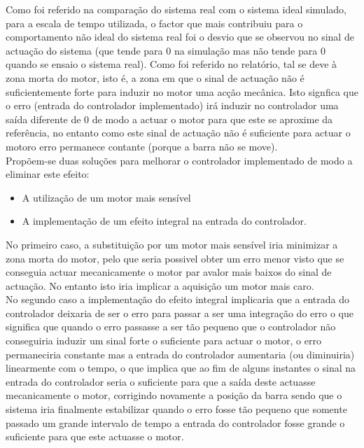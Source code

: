 \documentclass[%
  reprint,
  nofootinbib,
  amsmath,amssymb,
  aps,
  10pt,
  a4paper
]{revtex4-1}
\begin{document}
Como foi referido na comparação do sistema real com o sistema ideal simulado, para a escala de tempo utilizada, o factor que mais contribuiu para o comportamento não ideal do sistema real foi o desvio que se observou no sinal de actuação do sistema (que tende para 0 na simulação mas não tende para 0 quando se ensaio o sistema real). Como foi referido no relatório, tal se deve à zona morta do motor, isto é, a zona em que o sinal de actuação não é suficientemente forte para induzir no motor uma acção mecânica. Isto signfica que o erro (entrada do controlador implementado) irá induzir no controlador uma saída diferente de 0 de modo a actuar o motor para que este se aproxime da referência, no entanto como este sinal de actuação não é suficiente para actuar o motoro erro permanece contante (porque a barra não se move).\\

Propõem-se duas soluções para melhorar o controlador implementado de modo a eliminar este efeito:
\begin{itemize}
\item A utilização de um motor mais sensível
\item A implementação de um efeito integral na entrada do controlador.
\end{itemize}

No primeiro caso, a substituição por um motor mais sensível iria minimizar a zona morta do motor, pelo que seria possivel obter um erro menor visto que se conseguia actuar mecanicamente o motor par avalor mais baixos do sinal de actuação. No entanto isto iria implicar a aquisição um motor mais caro.\\

No segundo caso a implementação do efeito integral implicaria que a entrada do controlador deixaria de ser o erro para passar a ser uma integração do erro o que significa que quando o erro passasse a ser tão pequeno que o controlador não conseguiria induzir um sinal forte o suficiente para actuar o motor, o erro permaneciria constante mas a entrada do controlador aumentaria (ou diminuiria) linearmente com o tempo, o que implica que ao fim de alguns instantes o sinal na entrada do controlador seria o suficiente para que a saída deste actuasse mecanicamente o motor, corrigindo novamente a posição da barra sendo que o sistema iria finalmente estabilizar quando o erro fosse tão pequeno que somente passado um grande intervalo de tempo a entrada do controlador fosse grande o suficiente para que este actuasse o motor.
\end{document}
